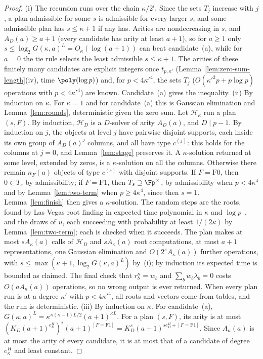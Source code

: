 \begin{proof}
(i) The recursion runs over the chain $\kappa/2^i$. Since the sets $T_j$ increase with $j$, a plan admissible for some $s$ is admissible for every larger $s$, and some admissible plan has $s \le \kappa+1$ if any has. Arities are nondecreasing in $s$, and $A_D(a) \ge a+1$ (every candidate has arity at least $a+1$), so for $a \ge 1$ only $s \le \log_2 G(\kappa,a)^L = O_\kappa(\log(a+1))$ can beat candidate~(a), while for $a = 0$ the tie rule selects the least admissible $s \le \kappa+1$. The arities of these finitely many candidates are explicit integers once $t_{p,\kappa'}$ (Lemma~\ref{lem:zero-sum-length}(iv), time $\poly(\log p)$) and, for $p < 4\kappa'^4$, the sets $T_j$ ($O(\kappa'^2p + p\log p)$ operations with $p < 4\kappa'^4$) are known. Candidate~(a) gives the inequality.
(ii) By induction on $\kappa$. For $\kappa = 1$ and for candidate~(a) this is Gaussian elimination and Lemma~\ref{lem:rounds}, deterministic given the zero sum. Let $\mathcal H_\kappa$ run a plan $(s,F)$. By induction, $\mathcal H_D$ is a $D$-solver of arity $A_D(a)$, and $D \mid p-1$. By induction on $j$, the objects at level $j$ have pairwise disjoint supports, each inside its own group of $A_D(a)^j$ columns, and all have type $c^{(j)}$: this holds for the columns at $j = 0$, and Lemma~\ref{lem:stage} preserves it. A $\kappa$-solution returned at some level, extended by zeros, is a $\kappa$-solution on all the columns. Otherwise there remain $n_F(a)$ objects of type $c^{(s)}$ with disjoint supports. If $F = \mathrm{F0}$, then $0 \in T_s$ by admissibility; if $F = \mathrm{F1}$, then $T_s \supseteq \Fp^\times$, by admissibility when $p < 4\kappa^4$ and by Lemma~\ref{lem:two-term} when $p \ge 4\kappa^4$, since then $s = 1$. Lemma~\ref{lem:finish} then gives a $\kappa$-solution. The random steps are the roots, found by Las Vegas root finding in expected time polynomial in $\kappa$ and $\log p$~\cite{Rabin1980}, and the draws of $u$, each succeeding with probability at least $1/(2\kappa)$ by Lemma~\ref{lem:two-term}; each is checked when it succeeds. The plan makes at most $sA_\kappa(a)$ calls of $\mathcal H_D$ and $sA_\kappa(a)$ root computations, at most $a+1$ representations, one Gaussian elimination and $O(2^sA_\kappa(a))$ further operations, with $s \le \max(\kappa+1,\log_2G(\kappa,a)^L)$ by~(i); by induction its expected time is bounded as claimed. The final check that $r_b^\kappa = w_b$ and $\sum_bw_b\lambda_b = 0$ costs $O(aA_\kappa(a))$ operations, so no wrong output is ever returned. When every plan run is at a degree $\kappa'$ with $p < 4\kappa'^4$, all roots and vectors come from tables, and the run is deterministic.
(iii) By induction on $\kappa$. For candidate~(a), $G(\kappa,a)^L = \kappa^{\kappa(\kappa-1)L/2}(a+1)^{\kappa L}$. For a plan $(s,F)$, its arity is at most $(K_D(a+1)^{e^H_D})^s(a+1)^{[F = \mathrm{F1}]} = K_D^s(a+1)^{se^H_D + [F = \mathrm{F1}]}$. Since $A_\kappa(a)$ is at most the arity of every candidate, it is at most that of a candidate of degree $e^H_\kappa$ and least constant.
\end{proof}


